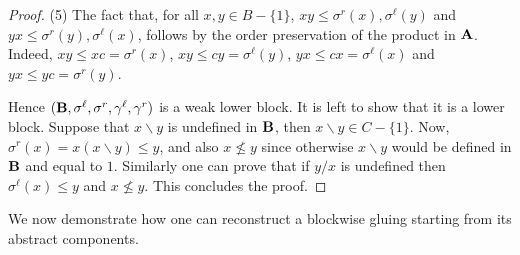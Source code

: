 \documentclass{amsart}
\theoremstyle{definition}
\numberwithin{equation}{section}
\newcommand{\alg}[1]{{\textbf{\upshape #1}}}  %
\newcommand{\sell}{\sigma^\ell}
\newcommand{\sr}{\sigma^r}
\newcommand{\gell}{\gamma^\ell}
\newcommand{\gr}{\gamma^r}
\begin{document}
\begin{proof}
(5) The fact that, for all $x,y \in B- \{1\}$, $xy \leq \sr(x), \sell(y)$ and $yx\leq \sr(y), \sell(x)$, follows by the order preservation of the product in $\alg A$. Indeed, $xy \leq xc=\sr(x)$, $xy \leq cy=\sell(y)$, $yx\leq cx=\sell(x)$ and $yx \leq yc=\sr(y)$. 

Hence $(\alg B, \sell, \sr, \gell, \gr)$ is a weak lower block. It is left to show that it is a lower block. Suppose that $x \backslash y$ is undefined in $\alg B$, then $x \backslash y \in C - \{1\}$. Now, $\sr(x) = x(x\backslash y) \leq y$, and also $x \not \leq y$ since otherwise $x \backslash y$ would be defined in $\alg B$ and equal to $1$.  Similarly one can prove that if $y / x$ is undefined then $\sell(x)\leq y$ and $x \not \leq y$. This concludes the proof.
  \end{proof}
	We now demonstrate how one can reconstruct a blockwise gluing starting from its abstract components. 
	
\end{document}
